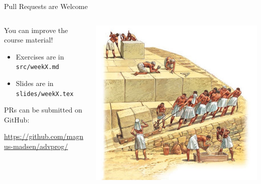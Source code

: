 \begin{frame}{Pull Requests are Welcome}
\begin{columns}
\begin{column}{.50\textwidth}
You can improve the course material!

\begin{itemize}
    \item Exercises are in \texttt{src/weekX.md}
    \item Slides are in \texttt{slides/weekX.tex}
\end{itemize}

\medskip

PRs can be submitted on GitHub:
\begin{center}
\scriptsize
\url{https://github.com/magnus-madsen/advprog/}
\end{center}
\end{column}
\begin{column}{.50\textwidth}
    \includegraphics[width=\textwidth]{img/pyramids.jpg}
\end{column}
\end{columns}
\end{frame}

